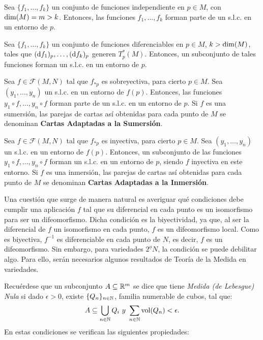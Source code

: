 \documentclass[Cursovd_portada.tex]{subfiles}
\begin{document}
\begin{coro}
Sea $\{f_1,\dots ,f_k\}$ un conjunto de funciones independiente en
$p\in M$, con ${\rm dim}(M)=m>k$. Entonces, las funciones
$f_1,\dots ,f_k$ forman parte de un s.l.c. en un entorno de $p$.
\end{coro}
\begin{coro}
Sea $\{f_1,\dots ,f_k\}$ un conjunto de funciones diferenciables
en $p\in M$, $k>{\rm dim}(M)$, tales que $({\rm d} f_1)_p,\dots
,({\rm d} f_k)_p$ generen $T_p^*(M)$. Entonces, un subconjunto de
tales funciones forman un s.l.c. en un entorno de $p$.
\end{coro}
\begin{coro}
Sea $f\in\mathcal{F}(M,N)$ tal que $f_{*p}$ es sobreyectiva, para
cierto $p\in M$. Sea $(y_1,\dots ,y_n)$ un s.l.c. en un entorno de
$f(p)$. Entonces, las funciones \ $y_1\circ f,\dots ,y_n\circ f$
forman parte de un s.l.c. en un entorno de $p$. Si $f$ es una
sumersión, las parejas de cartas así obtenidas para cada
punto de $M$ se denominan {\bf Cartas Adaptadas a la
Sumersión}.
\end{coro}
\begin{coro}
Sea $f\in\mathcal{F}(M,N)$ tal que $f_{*p}$ es inyectiva, para
cierto $p\in M$. Sea $(y_1,\dots ,y_n)$ un s.l.c. en un entorno de
$f(p)$. Entonces, un subconjunto de las funciones $y_1\circ
f,\dots ,y_n\circ f$ forman un s.l.c. en un entorno de $p$, siendo
$f$ inyectiva en este entorno. Si $f$ es una inmersión, las
parejas de cartas así obtenidas para cada punto de $M$ se
denominan {\bf Cartas Adaptadas a la Inmersión}.
\end{coro}
Una cuestión que surge de manera natural es averiguar qué
condiciones debe cumplir una aplicación $f$ tal que su
diferencial en cada punto es un isomorfismo para ser un
difeomorfismo. Dicha condición es la biyectividad, ya que, al
ser la diferencial de $f$ un isomorfismo en cada punto, $f$ es un
difeomorfismo local. Como es biyectiva, $f^{-1}$ es diferenciable
en cada punto de $N$, es decir, $f$ es un difeomorfismo. Sin
embargo, para variedades $2^{\underline{o}}N$, la condición se
puede debilitar algo. Para ello, serán necesarios algunos
resultados de Teoría de la Medida en variedades.
\par
Recuérdese que un subconjunto $A\subseteq\mathbb{R}^m$ se dice que
tiene {\it Medida (de Lebesgue) Nula} si dado $\epsilon>0$, existe
$\{Q_n\}_{n\in\mathbb{N}}$, familia numerable de cubos, tal que:
$$A\subseteq\bigcup_{n\in\mathbb{N}}Q_i\mbox{ }y\mbox{ }\sum_{n\in\mathbb{N}}{\rm vol}(Q_n)<\epsilon.$$
\hs En estas condiciones se verifican las siguientes propiedades:
\end{document}
